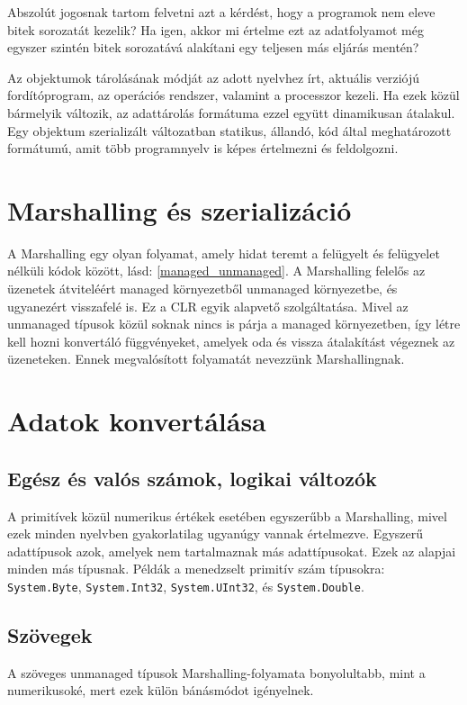 \documentclass[tocnopagenum]{thesis-ekf}
\begin{document}
	Abszolút jogosnak tartom felvetni azt a kérdést, hogy a programok nem eleve bitek sorozatát kezelik? Ha igen, akkor mi értelme ezt az adatfolyamot még egyszer szintén bitek sorozatává alakítani egy teljesen más eljárás mentén?
	
	Az objektumok tárolásának módját az adott nyelvhez írt, aktuális verziójú fordítóprogram, az operációs rendszer, valamint a processzor kezeli. Ha ezek közül bármelyik változik, az adattárolás formátuma ezzel együtt dinamikusan átalakul. Egy objektum szerializált változatban statikus, állandó, kód által meghatározott formátumú, amit több programnyelv is képes értelmezni és feldolgozni. 
	\cite{sof_serialization}
	\section{Marshalling és szerializáció}
	A Marshalling egy olyan folyamat, amely hidat teremt a felügyelt és felügyelet nélküli kódok között, lásd: \ref{managed_unmanaged}. A Marshalling felelős az üzenetek átviteléért managed környezetből unmanaged környezetbe, és ugyanezért visszafelé is. Ez a CLR egyik alapvető szolgáltatása. Mivel az unmanaged típusok közül soknak nincs is párja a managed környezetben, így létre kell hozni konvertáló függvényeket, amelyek oda és vissza átalakítást végeznek az üzeneteken. Ennek megvalósított folyamatát nevezzünk Marshallingnak.
	\cite{marshalling_serialization}
	\section{Adatok konvertálása}
	\subsection{Egész és valós számok, logikai változók}
	A primitívek közül numerikus értékek esetében egyszerűbb a Marshalling, mivel ezek minden nyelvben gyakorlatilag ugyanúgy vannak értelmezve.	Egyszerű adattípusok azok, amelyek nem tartalmaznak más adattípusokat. Ezek az alapjai minden más típusnak. Példák a menedzselt primitív szám típusokra: \verb*|System.Byte|, \verb*|System.Int32|, \verb*|System.UInt32|, és \verb*|System.Double|.
	\cite{marsh}
	\subsection{Szövegek}
	A szöveges unmanaged típusok Marshalling-folyamata bonyolultabb, mint a numerikusoké, mert ezek külön bánásmódot igényelnek.
	
\end{document}
